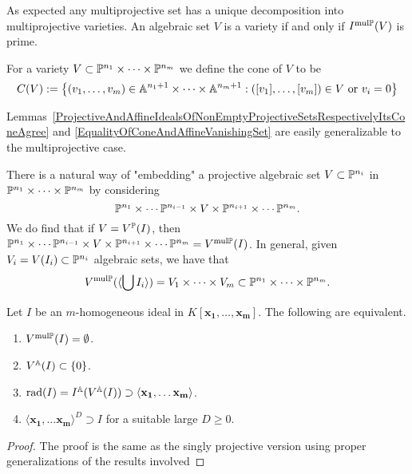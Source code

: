         \begin{remark}
            As expected any multiprojective set has a unique decomposition into multiprojective varieties. An algebraic set $V$ is a variety if and only if $I^{\mathrm{mul}\mathbb{P}}(V)$ is prime.
        \end{remark}
        \begin{definition}
            For a variety $V\subset \mathbb{P}^{n_1}\times \cdots \times \mathbb{P}^{n_m}$ we define the cone of $V$ to be 
            $$C(V):=\left\{(v_1,\dots,v_m)\in \mathbb{A}^{n_1+1}\times\cdots\times\mathbb{A}^{n_m+1} : ([v_1],\dots,[v_m])\in V \text{ or } v_i=0\right\}$$
        \end{definition}
        \begin{remark}
            Lemmas~\ref{ProjectiveAndAffineIdealsOfNonEmptyProjectiveSetsRespectivelyItsConeAgree} and \ref{EqualityOfConeAndAffineVanishingSet} are easily generalizable to the multiprojective case. 
        \end{remark}
        There is a natural way of "embedding" a projective algebraic set $V\subset \mathbb{P}^{n_i}$ in $\mathbb{P}^{n_1}\times\cdots\times \mathbb{P}^{n_m}$ by considering $$\mathbb{P}^{n_1}\times\cdots \mathbb{P}^{n_{i-1}}\times V\times \mathbb{P}^{n_{i+1}}\times \cdots \mathbb{P}^{n_m}.$$
        We do find that if $V=V^{\mathbb{P}}(I)$, then $\mathbb{P}^{n_1}\times\cdots \mathbb{P}^{n_{i-1}}\times V\times \mathbb{P}^{n_{i+1}}\times \cdots \mathbb{P}^{n_m}=V^{\mathrm{mul}\mathbb{P}}(I)$.
        In general, given $V_i=V(I_i)\subset \mathbb{P}^{n_i}$ algebraic sets, we have that 
        $$V^{\mathrm{mul}\mathbb{P}}(\langle \bigcup I_i\rangle)= V_1\times \cdots\times V_m\subset \mathbb{P}^{n_1}\times\cdots\times\mathbb{P}^{n_m}.$$
        \begin{lemma}
            Let $I$ be an $m$-homogeneous ideal in $K[\mathbf{x_1},\dots,\mathbf{x_m}]$. The following are equivalent.
            \begin{enumerate}
                \item $V^{\mathrm{mul}\mathbb{P}}(I)=\emptyset$.
                \item $V^{\mathbb{A}}(I)\subset\{0\}$.
                \item $\mathrm{rad}(I)=I^{\mathbb{A}}(V^{\mathbb{A}}(I))\supset \langle \mathbf{x_1},\dots\mathbf{x_m}\rangle$.
                \item $\langle \mathbf{x_1},\dots\mathbf{x_m}\rangle^D \supset I$ for a suitable large $D\geq 0$.
            \end{enumerate}
        \end{lemma}
        \begin{proof}
            The proof is the same as the singly projective version using proper generalizations of the results involved
        \end{proof}
